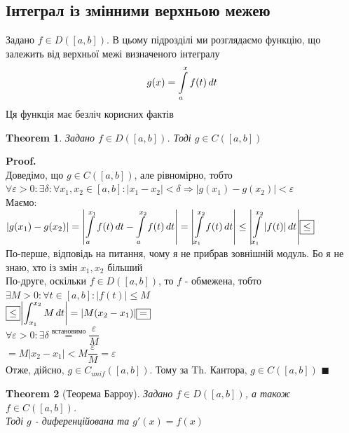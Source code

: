 \documentclass[a4paper, 14pt]{extarticle}
\def\huge{\displaystyle}
\theoremstyle{theoremdd}
\newtheorem{theorem}{Theorem}[subsection]
\theoremstyle{theoremdd}
\theoremstyle{theoremdd}
\theoremstyle{theoremdd}
\theoremstyle{theoremdd}
\theoremstyle{theoremdd}
\theoremstyle{theoremdd}
\theoremstyle{theoremdd}
\newenvironment{pf}{\vspace*{-3mm} \textbf{Proof. \\}}{$\blacksquare$}
\begin{document}
\subsection{Інтеграл із змінними верхньою межею}
Задано $f \in D([a,b])$. В цьому підрозділі ми розглядаємо функцію, що залежить від верхньої межі визначеного інтегралу
\begin{align*}
g(x) = \int\displaylimits_a^x f(t)\,dt
\end{align*}
Ця функція має безліч корисних фактів
\begin{theorem}
Задано $f \in D([a,b])$. Тоді $g \in C([a,b])$
\end{theorem}

\begin{pf}
Доведімо, що $g \in C([a,b])$, але рівномірно, тобто\\
$\forall \varepsilon > 0: \exists \delta: \forall x_1,x_2 \in [a,b]: |x_1-x_2|<\delta \Rightarrow |g(x_1)-g(x_2)|<\varepsilon$\\
Маємо:\\
$\huge |g(x_1)-g(x_2)| = \abs{\int\displaylimits_a^{x_1} f(t)\,dt - \int\displaylimits_a^{x_2} f(t)\,dt} = \abs{\int\displaylimits_{x_1}^{x_2} f(t)\,dt} \leq \abs{\int\displaylimits_{x_1}^{x_2} |f(t)|\,dt} \boxed{\leq}$\\
По-перше, відповідь на питання, чому я не прибрав зовнішній модуль. Бо я не знаю, хто із змін $x_1,x_2$ більший\\
По-друге, оскільки $f \in D([a,b])$, то $f$ - обмежена, тобто \\ $\exists M>0: \forall t \in [a,b]: |f(t)| \leq M$\\
$\huge \boxed{\leq} \abs{\int_{x_1}^{x_2} M\,dt} = |M(x_2-x_1)| \boxed{=}$\\
$\forall \varepsilon > 0: \exists \delta \overset{\text{встановимо}}{=} \dfrac{\varepsilon}{M}$\\
$\boxed{=} M|x_2-x_1| < M \dfrac{\varepsilon}{M} = \varepsilon$\\
Отже, дійсно, $g \in C_{unif}([a,b])$. Тому за Th. Кантора, $g \in C([a,b])$
\end{pf}

\begin{theorem}[Теорема Барроу]
Задано $f \in D([a,b])$, а також $f \in C([a,b])$. \\ Тоді $g$ - диференційована та $g'(x) = f(x)$
\end{theorem}
\end{document}
